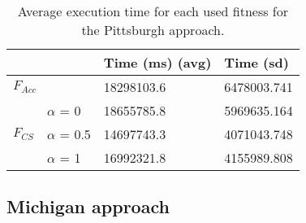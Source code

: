 \documentclass[a4paper,10pt,twocolumn,preprint,3p]{elsarticle}
\begin{document}
\begin{table*}
\begin{center}
\begin{tabular}{ll|l|l|}
\cline{3-4}
                                                &                & Time (ms) (avg) & Time (sd)   \\ \hline
\multicolumn{2}{|l|}{$F_{Acc}$}                                  & 18298103.6      & 6478003.741 \\ \hline
\multicolumn{1}{|l|}{\multirow{3}{*}{$F_{CS}$}} & $\alpha$ = 0   & 18655785.8      & 5969635.164 \\ \cline{2-4} 
\multicolumn{1}{|l|}{}                          & $\alpha$ = 0.5 & 14697743.3      & 4071043.748 \\ \cline{2-4} 
\multicolumn{1}{|l|}{}                          & $\alpha$ = 1   & 16992321.8      & 4155989.808 \\ \hline
\end{tabular}
\caption{Average execution time for each used fitness for the Pittsburgh approach.}
\label{tab:pittsburghTime}
\end{center}
\end{table*}

\subsection{Michigan approach}
\label{subsec:michigan}
\end{document}
